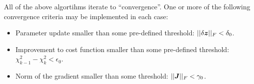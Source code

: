 \documentclass[useAMS,usenatbib]{mn2e}
\newcommand{\mat}[1]{{\bmath{#1}}}
\newcommand{\JJ}{\mat{J}} %
\numberwithin{equation}{section}
\begin{document}
All of the above algortihms iterate to ``convergence''. One or more of the following convergence criteria may be implemented in each case:

\begin{itemize}
\item Parameter update smaller than some pre-defined threshold: $||\delta \bmath{z}||_F<\delta_0$.
\item Improvement to cost function smaller than some pre-defined threshold: $\chi^2_{k-1}-\chi^2_{k}<\epsilon_0$.
\item Norm of the gradient smaller than some threshold:  $||\JJ||_F<\gamma_0$.
\end{itemize}



\label{lastpage}
\end{document}
